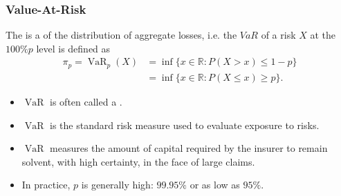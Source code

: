 \documentclass[notoc,notitlepage]{tufte-book}
\DeclareMathOperator{\VaR}{VaR}
\begin{document}
\subsubsection{Value-At-Risk}
\label{ssub:Value-At-Risk}

\begin{defn}
\label{defn:value_at_risk}
The  is a  of the distribution of aggregate losses, i.e. the $VaR$ of a risk $X$ at the $100\%p$ level is defined as
  \begin{align*}
    \pi_p = \VaR_p (X) &= \inf \{ x \in \mathbb{R} : P (X > x) \leq 1 - p \} \\
               &= \inf \{ x \in \mathbb{R} : P (X \leq x) \geq p \}.
  \end{align*}
\end{defn}

\begin{note}
  \begin{itemize}
    \item $\VaR$ is often called a .
    \item $\VaR$ is the standard risk measure used to evaluate exposure to risks.
    \item $\VaR$ measures the amount of capital required by the insurer to remain solvent, with high certainty, in the face of large claims.
    \item In practice, $p$ is generally high: $99.95\%$ or as low as $95\%$.
  \end{itemize}
\end{note}
\end{document}
